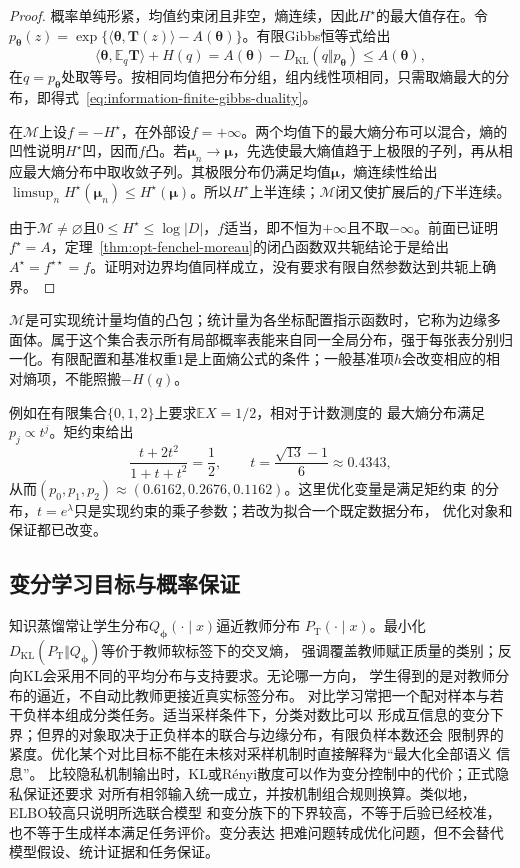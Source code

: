 \begin{proof}
概率单纯形紧，均值约束闭且非空，熵连续，因此\(H^\star\)的最大值存在。令\(p_{\bm\theta}(z)=\exp\{\langle\bm\theta,\bm T(z)\rangle-A(\bm\theta)\}\)。有限Gibbs恒等式给出
\[
  \langle\bm\theta,\mathbb E_q\bm T\rangle+H(q)
  =A(\bm\theta)-D_{\mathrm{KL}}(q\Vert p_{\bm\theta})\leq A(\bm\theta),
\]
在\(q=p_{\bm\theta}\)处取等号。按相同均值把分布分组，组内线性项相同，只需取熵最大的分布，即得式~\eqref{eq:information-finite-gibbs-duality}。

在\(\mathcal M\)上设\(f=-H^\star\)，在外部设\(f=+\infty\)。两个均值下的最大熵分布可以混合，熵的凹性说明\(H^\star\)凹，因而\(f\)凸。若\(\bm\mu_n\to\bm\mu\)，先选使最大熵值趋于上极限的子列，再从相应最大熵分布中取收敛子列。其极限分布仍满足均值\(\bm\mu\)，熵连续性给出\(\limsup_nH^\star(\bm\mu_n)\leq H^\star(\bm\mu)\)。所以\(H^\star\)上半连续；\(\mathcal M\)闭又使扩展后的\(f\)下半连续。

由于\(\mathcal M\neq\varnothing\)且\(0\leq H^\star\leq\log|D|\)，\(f\)适当，即不恒为\(+\infty\)且不取\(-\infty\)。前面已证明\(f^\star=A\)，定理~\ref{thm:opt-fenchel-moreau}的闭凸函数双共轭结论于是给出\(A^\star=f^{\star\star}=f\)。证明对边界均值同样成立，没有要求有限自然参数达到共轭上确界。
\end{proof}
\(\mathcal M\)是可实现统计量均值的凸包；统计量为各坐标配置指示函数时，它称为边缘多面体。属于这个集合表示所有局部概率表能来自同一全局分布，强于每张表分别归一化。有限配置和基准权重\(1\)是上面熵公式的条件；一般基准项\(h\)会改变相应的相对熵项，不能照搬\(-H(q)\)。

例如在有限集合\(\{0,1,2\}\)上要求\(\mathbb{E}X=1/2\)，相对于计数测度的
最大熵分布满足\(p_j\propto t^j\)。矩约束给出
\[
  \frac{t+2t^2}{1+t+t^2}=\frac12,
  \qquad
  t=\frac{\sqrt{13}-1}{6}\approx0.4343,
\]
从而\((p_0,p_1,p_2)\approx(0.6162,0.2676,0.1162)\)。这里优化变量是满足矩约束
的分布，\(t=e^\lambda\)只是实现约束的乘子参数；若改为拟合一个既定数据分布，
优化对象和保证都已改变。
\subsection{变分学习目标与概率保证}
知识蒸馏常让学生分布\(Q_{\bm{\phi}}(\cdot\mid x)\)逼近教师分布
\(P_{\mathrm{T}}(\cdot\mid x)\)。最小化
\(D_{\mathrm{KL}}(P_{\mathrm{T}}\Vert Q_{\bm{\phi}})\)等价于教师软标签下的交叉熵，
强调覆盖教师赋正质量的类别；反向KL会采用不同的平均分布与支持要求。无论哪一方向，
学生得到的是对教师分布的逼近，不自动比教师更接近真实标签分布。
对比学习常把一个配对样本与若干负样本组成分类任务。适当采样条件下，分类对数比可以
形成互信息的变分下界；但界的对象取决于正负样本的联合与边缘分布，有限负样本数还会
限制界的紧度。优化某个对比目标不能在未核对采样机制时直接解释为“最大化全部语义
信息”。
比较隐私机制输出时，KL或R\'enyi散度可以作为变分控制中的代价；正式隐私保证还要求
对所有相邻输入统一成立，并按机制组合规则换算。类似地，ELBO较高只说明所选联合模型
和变分族下的下界较高，不等于后验已经校准，也不等于生成样本满足任务评价。变分表达
把难问题转成优化问题，但不会替代模型假设、统计证据和任务保证。
